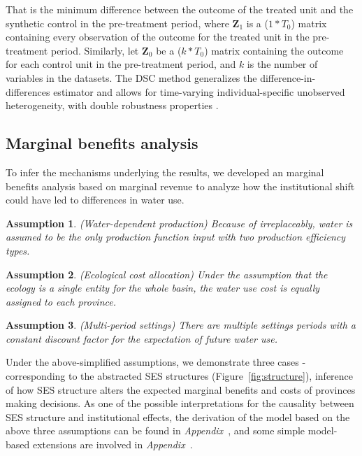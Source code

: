 \documentclass[default, sn-standardnature]{sn-jnl} %
\newtheorem{ass}{Assumption}
\providecommand{\DIFaddtex}[1]{{\protect\color{blue}\uwave{#1}}} %
\providecommand{\DIFaddbegin}{} %
\providecommand{\DIFaddend}{} %
\providecommand{\DIFadd}[1]{\texorpdfstring{\DIFaddtex{#1}}{#1}} %
\newcommand{\DIFaddincludegraphics}[2][]{{\color{blue}\fbox{\DIFOincludegraphics[#1]{#2}}}} %
\DeclareRobustCommand{\DIFaddbegin}{\DIFOaddbegin \let\includegraphics\DIFaddincludegraphics} %
\DeclareRobustCommand{\DIFaddend}{\DIFOaddend \let\includegraphics\DIFOincludegraphics} %
\begin{document}
That is the minimum difference between the outcome of the treated unit and the synthetic control in the pre-treatment period, where $\mathbf{Z}_{1}$ is a ($1*T_0$) matrix containing every observation of the outcome for the treated unit in the pre-treatment period. Similarly, let $\mathbf{Z}_{0}$ be a ($k * T_0$) matrix containing the outcome for each control unit in the pre-treatment period, and $k$ is the number of variables in the datasets.
The DSC method generalizes the difference-in-differences estimator and allows for time-varying individual-specific unobserved heterogeneity, with double robustness properties \cite{billmeier2013, smith2015}.

\subsection{Marginal benefits analysis}\label{sec:model}
To infer the mechanisms underlying the results, we developed an marginal benefits analysis based on marginal revenue to analyze how the institutional shift could have led to differences in water use.

\begin{ass}
    (Water-dependent production) Because of irreplaceably, water is assumed to be the only production function input with two production efficiency types.
\end{ass}

\begin{ass}
    (Ecological cost allocation) Under the assumption that the ecology is a single entity for the whole basin, the water use cost is equally assigned to each province.
\end{ass}

\begin{ass}
    (Multi-period settings) There are multiple settings periods with a constant discount factor for the expectation of future water use.
\end{ass}

Under the above-simplified assumptions, we demonstrate three cases -corresponding to the abstracted SES structures (Figure~\ref{fig:structure}\DIFaddbegin \DIFadd{~C}\DIFaddend ), inference of how SES structure alters the expected marginal benefits and costs of provinces making decisions.
As one of the possible interpretations for the causality between SES structure and institutional effects, the derivation of the model based on the above three assumptions can be found in \textit{Appendix~}, and some simple model-based extensions are involved in \textit{Appendix~}.
\end{document}
